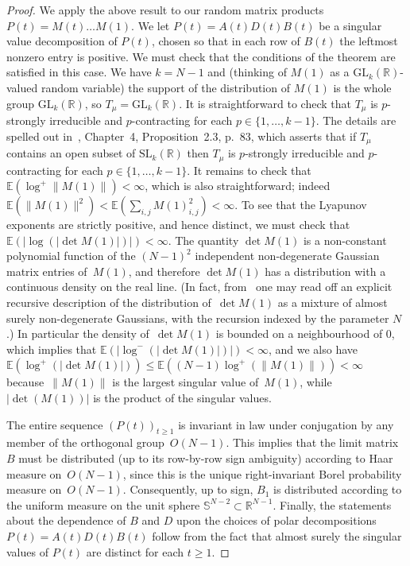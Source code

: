 \documentclass[12pt]{article}
\newcommand{\1}{\mathbf{1}}
\begin{document}
\begin{proof}
We apply the above result to our random matrix products $P(t) = M(t) \dots M(1)$. We let $P(t) = A(t)D(t)B(t)$ be a singular value decomposition of $P(t)$, chosen so that in each row of $B(t)$ the leftmost nonzero entry is positive. We must check that the conditions of the theorem are satisfied in this case. We have $k=N-1$ and {(thinking of $M(1)$ as a $\mathrm{GL}_k(\mathbb{R})$-valued random variable)} the support of the distribution of $M(1)$ is the whole group $\mathrm{GL}_{k}(\mathbb{R})$, so $T_\mu = \mathrm{GL}_{k}(\mathbb{R})$. 
It is straightforward to check that $T_\mu$ is $p$-strongly irreducible and $p$-contracting for each $p \in \{1, \dots, k-1\}$. The details are spelled out in~\cite{BougerolLacroix}, Chapter~4, Proposition~2.3, {p.~83,} which asserts that if $T_\mu$ contains an open subset of $\mathrm{SL}_k(\mathbb{R})$ then $T_\mu$ is $p$-strongly irreducible and $p$-contracting for each $p \in \{1, \dots, k-1\}$.  It remains to check that $\mathbb{E}(\log^+ \| M(1) \|) < \infty$, which is also straightforward; indeed $\mathbb{E}(\|M(1)\|^2) < \mathbb{E}( \sum_{i,j} M(1)_{i,j}^2) < \infty$.   To see that the Lyapunov exponents are strictly positive, and hence distinct, we must check that $\mathbb{E}(| \log( |\det M(1)| )|) < \infty$. The quantity $\det M(1)$ is a non-constant polynomial function of the $(N-1)^2$ independent non-degenerate Gaussian matrix entries of~$M(1)$, and therefore $\det M(1)$ has a distribution with a continuous density on the real line. (In fact, from~\cite[Section~ 2]{KV} one may read off an explicit recursive description of the distribution of~$\det M(1)$ as a mixture of almost surely non-degenerate Gaussians, with the recursion indexed by the parameter $N$.)  In particular the density of~$\det M(1)$ is bounded on a neighbourhood of $0$, which implies that $\mathbb{E}(|\log^{-}(|\det M(1)|)|) < \infty$, and we also have $\mathbb{E}(\log^{+}(|\det M(1)|)) \le \mathbb{E}((N-1)\log^{+}(\|M(1)\|)) < \infty$ because~$\|M(1)\|$ is the largest singular value of~$M(1)$, while~$|\det(M(1))|$ is the product of the singular values.  

The entire sequence $\left(P(t)\right)_{t \ge 1}$ is invariant in law under conjugation by any member of the orthogonal group~$O(N-1)$. This implies that the limit matrix $B$ must be distributed (up to its row-by-row sign ambiguity) according to Haar measure on~$O(N-1)$, since this is the unique right-invariant Borel probability measure on~$O(N-1)$. Consequently, up to sign, $B_1$ is distributed according to the uniform measure on the unit sphere $\mathbb{S}^{N-2} \subset \mathbb{R}^{N-1}$. Finally, the statements about the dependence of $B$ and $D$ upon the choices of polar decompositions $P(t) = A(t) D(t) B(t)$ follow from the fact that almost surely the singular values of $P(t)$ are distinct for each $t \ge 1$.
\end{proof}
\end{document}
